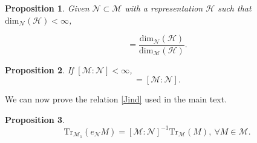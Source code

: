\documentclass[a4paper,11pt]{article}
\newtheorem{Proposition}{Proposition}[subsection]
\begin{document}
\begin{Proposition}
    Given $\mathcal{N} \subset \mathcal{M}$ with a representation $\mathcal{H}$ such that $\mathrm{dim}_{\mathcal{N}}(\mathcal{H}) < \infty$,

    \begin{equation}
        [\mathcal{M} : \mathcal{N}] = \frac{\mathrm{dim}_{\mathcal{N}}(\mathcal{H})}{\mathrm{dim}_{\mathcal{M}}(\mathcal{H})} \text{.}
    \end{equation}
\end{Proposition}

\begin{Proposition}
    If $[\mathcal{M} : \mathcal{N}] < \infty$,
    \begin{equation}
        [\mathcal{M}_1 : \mathcal{M}] = [\mathcal{M} : \mathcal{N}] \text{.}
    \end{equation}
\end{Proposition}

We can now prove the relation \ref{Jind} used in the main text.

\begin{Proposition}
    \begin{equation}
        \mathrm{Tr}_{\mathcal{M}_1}(e_{\mathcal{N}} M) = [\mathcal{M} : \mathcal{N}]^{-1} \mathrm{Tr}_{\mathcal{M}}(M), \ \forall M \in \mathcal{M} \text{.}
    \end{equation}
\end{Proposition}
\end{document}
